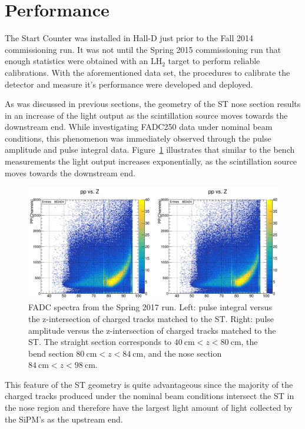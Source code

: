 \section{Performance} \label{sec:perform}

The Start Counter was installed in Hall-D just prior to the Fall 2014 \gx{} commissioning run.  It was not until the Spring 2015 commissioning run that enough statistics were obtained with an $\mathrm{LH_{2}}$ target to perform reliable calibrations.  With the aforementioned data set, the procedures to calibrate the detector and measure it's performance were developed and deployed.

As was discussed in previous sections, the geometry of the ST nose section results in an increase of the light output as the scintillation source moves towards the downstream end.  While investigating FADC250 data under nominal beam conditions, this phenomenon was immediately observed through the pulse amplitude and pulse integral data. Figure~\ref{fig:pippvszint} illustrates that similar to the bench measurements the light output increases exponentially, as the scintillation source moves towards the downstream end.
	\begin{figure}[!htb]
		\centering
		\includegraphics[width=1.0\columnwidth]{performance/figs/pi_pp_vs_zint}
		\caption{FADC spectra from the Spring 2017 run. Left: pulse integral versus the z-intersection of charged tracks matched to the ST. Right: pulse amplitude versus the z-intersection of charged tracks matched to the ST. The straight section corresponds to $40\ \mathrm{cm} < z < 80\ \mathrm{cm}$, the bend section $80\ \mathrm{cm} < z < 84\ \mathrm{cm}$, and the nose section $84\ \mathrm{cm} < z < 98\ \mathrm{cm}$.}
		\label{fig:pippvszint}
	\end{figure}
This feature of the ST geometry is quite advantageous since the majority of the charged tracks produced under the nominal \gx{} beam conditions intersect the ST in the nose region and therefore have the largest light amount of light collected by the SiPM's as the upstream end.

